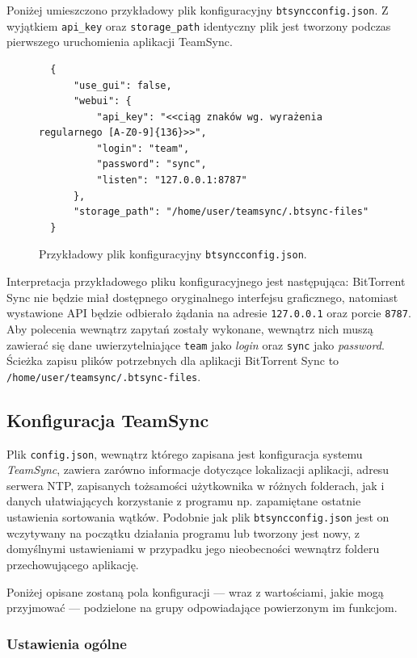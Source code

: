 \documentclass[polish,a4paper,twoside]{ppfcmthesis}
\begin{document}
Poniżej umieszczono przykładowy plik konfiguracyjny \texttt{btsyncconfig.json}. Z wyjątkiem \texttt{api\_key} oraz \texttt{storage\_path} identyczny plik jest tworzony podczas pierwszego uruchomienia aplikacji TeamSync.

\begin{figure}[htb]
  \begin{verbatim}
  {
      "use_gui": false, 
      "webui": {
          "api_key": "<<ciąg znaków wg. wyrażenia regularnego [A-Z0-9]{136}>>", 
          "login": "team", 
          "password": "sync", 
          "listen": "127.0.0.1:8787"
      }, 
      "storage_path": "/home/user/teamsync/.btsync-files"
  }
  \end{verbatim}
  \caption{Przykładowy plik konfiguracyjny \texttt{btsyncconfig.json}.}
\end{figure}

Interpretacja przykładowego pliku konfiguracyjnego jest następująca: BitTorrent Sync nie będzie miał dostępnego oryginalnego interfejsu graficznego, natomiast wystawione API będzie odbierało żądania na adresie \texttt{127.0.0.1} oraz porcie \texttt{8787}. Aby polecenia wewnątrz zapytań zostały wykonane, wewnątrz nich muszą zawierać się dane uwierzytelniające \texttt{team} jako \emph{login} oraz \texttt{sync} jako \emph{password}. Ścieżka zapisu plików potrzebnych dla aplikacji BitTorrent Sync to \texttt{/home/user/\-teamsync/.btsync-files}.

\subsection{Konfiguracja TeamSync}

\label{configteamsync}

Plik \texttt{config.json}, wewnątrz którego zapisana jest konfiguracja systemu \emph{TeamSync}, zawiera zarówno informacje dotyczące lokalizacji aplikacji, adresu serwera NTP, zapisanych tożsamości użytkownika w różnych folderach, jak i danych ułatwiających korzystanie z programu np. zapamiętane ostatnie ustawienia sortowania wątków. Podobnie jak plik \texttt{btsyncconfig.json} jest on wczytywany na początku działania programu lub tworzony jest nowy, z domyślnymi ustawieniami w przypadku jego nieobecności wewnątrz folderu przechowującego aplikację.

Poniżej opisane zostaną pola konfiguracji --- wraz z wartościami, jakie mogą przyjmować --- podzielone na grupy odpowiadające powierzonym im funkcjom.

\subsubsection*{Ustawienia ogólne}
\end{document}
